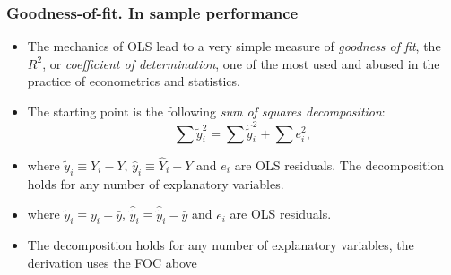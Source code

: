 \documentclass[
  shownotes,
  xcolor={svgnames},
  hyperref={colorlinks,citecolor=DarkBlue,linkcolor=andesred,urlcolor=DarkBlue}
  , aspectratio=169]{beamer}
\begin{document}
\begin{frame}
\frametitle{Goodness-of-fit. In  sample performance}

\begin{itemize}
\item The mechanics of OLS lead to a very simple measure of \emph{goodness of fit}, the $R^2$, or \emph{coefficient of determination}, one of the most used and abused in the practice of econometrics and statistics. 
\medskip
\item The starting point is the following \emph{sum of squares decomposition}:
\medskip
\[ \sum \tilde{y}_i^2  = \sum \hat \tilde{y}_i^2 + \sum e_i^2,\] 

\item where $\tilde{y}_i \equiv Y_i - \bar Y$, $\hat y_i \equiv \hat Y_i - \bar Y$ and $e_i$ are OLS residuals. The decomposition holds for any number of explanatory variables.
\medskip

\item where $\tilde{y}_i \equiv y_i - \bar y$, $\hat \tilde{y}_i \equiv \hat \tilde{y}_i - \bar y$ and $e_i$ are OLS residuals. 
\medskip
\item The decomposition holds for any number of explanatory variables,  the derivation uses the FOC above
\end{itemize}
\end{frame}
\end{document}
